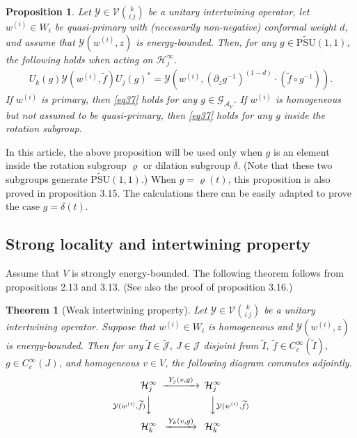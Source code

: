 \documentclass[11pt,b5paper,notitlepage]{article}
\theoremstyle{definition}
\theoremstyle{plain}
\newtheorem{thm}[df]{Theorem}
\newtheorem{pp}[df]{Proposition}
\newcommand{\mc}{\mathcal}
\newcommand{\wtd}{\widetilde}
\newcommand{\UPSU}{\widetilde{\mathrm{PSU}}(1,1)}
\newcommand{\GAV}{\mathscr G_{\mathcal A_V}}
\newcommand{\Jtd}{\widetilde{\mathcal J}}
\numberwithin{equation}{subsection}
\begin{document}
\begin{pp}\label{lb44}
Let $\mc Y\in\mc V{k\choose i~j}$ be a unitary intertwining operator, let $w^{(i)}\in W_i$ be quasi-primary with (necessarily non-negative) conformal weight $d$, and assume that $\mc Y(w^{(i)},z)$ is energy-bounded.  Then, for any $g\in\UPSU$, the following holds when acting on $\mc H_j^\infty$.
\begin{align}
U_k(g)\mc Y(w^{(i)},\wtd f)U_j(g)^*=\mc Y(w^{(i)},(\partial_zg^{-1})^{(1-d)}\cdot (\wtd f\circ g^{-1})).\label{eq37}
\end{align}
If $w^{(i)}$ is primary, then \eqref{eq37} holds for any $g\in\GAV$. If $w^{(i)}$ is homogeneous but not assumed to be quasi-primary, then \eqref{eq37} holds for any $g$ inside the rotation subgroup. 
\end{pp}
In this article, the above proposition will be used only when $g$ is an element inside the rotation subgroup $\varrho$ or dilation subgroup $\delta$. (Note that these two subgroups generate $\UPSU$.) When $g=\varrho(t)$, this proposition is also proved in \cite{Gui19a} proposition 3.15. The calculations there can be easily adapted to prove the case $g=\delta(t)$.






\subsection{Strong locality and intertwining property}\label{lb67}

Assume that  $V$ is strongly energy-bounded. The following theorem follows from \cite{Gui19a} propositions 2.13 and 3.13. (See also the proof of \cite{Gui19a} proposition 3.16.)

\begin{thm}[Weak intertwining property]\label{lb63}
Let $\mc Y\in\mc V{k\choose i~j}$ be a unitary intertwining operator. Suppose that $w^{(i)}\in W_i$ is homogeneous and $\mc Y(w^{(i)},z)$ is energy-bounded. Then for any $\wtd I\in\Jtd$, $J\in\mc J$ disjoint from $\wtd I$, $\wtd f\in C_c^\infty(\wtd I)$, $g\in C_c^\infty(J)$, and homogeneous $v\in V$, the following diagram commutes adjointly.
\begin{align}\label{eq38}
\begin{CD}
\mc H_j^\infty @>~Y_j(v,g)~>> \mc H_j^\infty\\
@V \mc Y(w^{(i)},\wtd f)  VV @VV \mc Y(w^{(i)},\wtd f) V\\
\mc H_k^\infty @> Y_k(v,g)>> \mc H_k^\infty
\end{CD}
\end{align}	
\end{thm}
\end{document}
